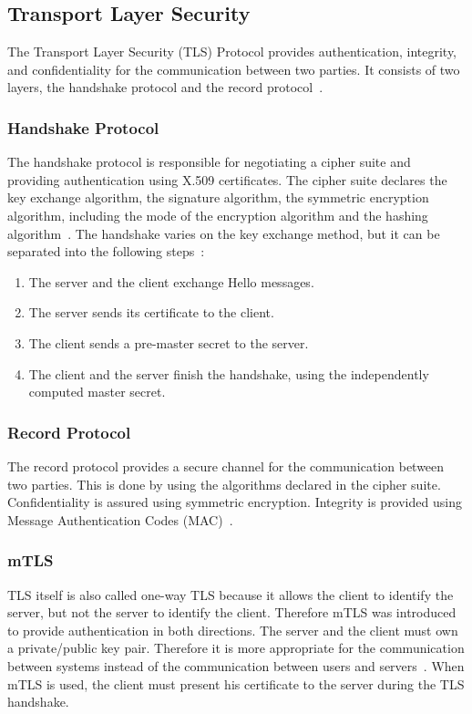 \subsection{Transport Layer Security}
The Transport Layer Security (TLS) Protocol provides authentication, integrity, and confidentiality for the communication between two parties.
It consists of two layers, the handshake protocol and the record protocol~\cite{turnertls}.

\subsubsection{Handshake Protocol}
The handshake protocol is responsible for negotiating a cipher suite and providing authentication using X.509 certificates.
The cipher suite declares the key exchange algorithm, the signature algorithm, the symmetric encryption algorithm, including the mode of the encryption algorithm and the hashing algorithm~\cite{turnertls, kurbatov2021design}.
The handshake varies on the key exchange method, but it can be separated into the following steps~\cite{krawczyk2013security}:
\begin{enumerate}
    \item The server and the client exchange Hello messages.
    \item The server sends its certificate to the client.
    \item The client sends a pre-master secret to the server.
    \item The client and the server finish the handshake, using the independently computed master secret.
\end{enumerate}

\subsubsection{Record Protocol}
The record protocol provides a secure channel for the communication between two parties.
This is done by using the algorithms declared in the cipher suite.
Confidentiality is assured using symmetric encryption.
Integrity is provided using Message Authentication Codes (MAC)~\cite{kurbatov2021design, krawczyk2013security}.

\subsubsection{mTLS} \label{sec:mtls}
TLS itself is also called one-way TLS because it allows the client to identify the server, but not the server to identify the client.
Therefore mTLS was introduced to provide authentication in both directions.
The server and the client must own a private/public key pair.
Therefore it is more appropriate for the communication between systems instead of the communication between users and servers~\cite{dias2020microservices}. 
When mTLS is used, the client must present his certificate to the server during the TLS handshake.


